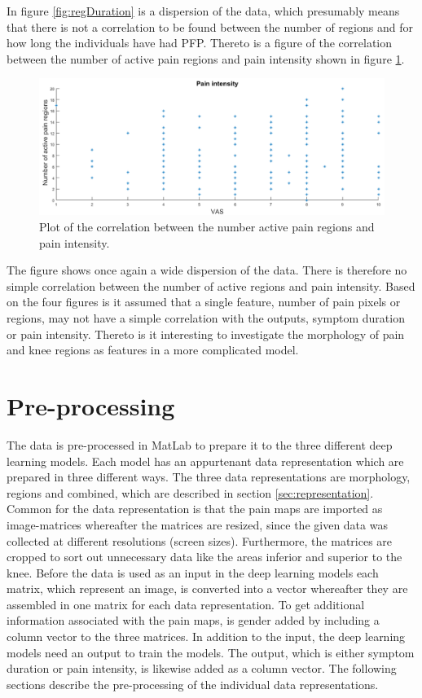 \newpage
\noindent
In figure \ref{fig:regDuration} is a dispersion of the data, which presumably means that there is not a correlation to be found between the number of regions and for how long the individuals have had PFP. 
Thereto is a figure of the correlation between the number of active pain regions and pain intensity shown in figure \ref{fig:regPain}.

\begin{figure} [H]
\centering
\includegraphics[width=1\textwidth]{figures/regionRegressionPain}
\caption{Plot of the correlation between the number active pain regions and pain intensity.}
\label{fig:regPain}
\end{figure}

\noindent
The figure shows once again a wide dispersion of the data. There is therefore no simple correlation between the number of active regions and pain intensity. 
\noindent
Based on the four figures is it assumed that a single feature, number of pain pixels or regions, may not have a simple correlation with the outputs, symptom duration or pain intensity. Thereto is it interesting to investigate the morphology of pain and knee regions as features in a more complicated model. 


\section{Pre-processing}
The data is pre-processed in MatLab to prepare it to the three different deep learning models. Each model has an appurtenant data representation which are prepared in three different ways. The three data representations are morphology, regions and combined, which are described in section \ref{sec:representation}. Common for the data representation is that the pain maps are imported as image-matrices whereafter the matrices are resized, since the given data was collected at different resolutions (screen sizes). Furthermore, the matrices are cropped to sort out unnecessary data like the areas inferior and superior to the knee.
Before the data is used as an input in the deep learning models each matrix, which represent an image, is converted into a vector whereafter they are assembled in one matrix for each data representation. To get additional information associated with the pain maps, is gender added by including a column vector to the three matrices.
In addition to the input, the deep learning models need an output to train the models. The output, which is either symptom duration or pain intensity, is likewise added as a column vector.
The following sections describe the pre-processing of the individual data representations.

